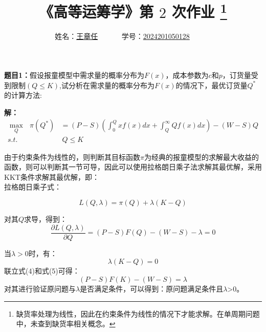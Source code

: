 \documentclass[12pt,a4paper]{article}
\begin{document}
\title{
{\heiti《高等运筹学》第 {$2$} 次作业
\footnote{
 缺货率处理为线性，因此在约束条件为线性的情况下才能求解。在单周期问题中，未查到缺货率相关概念。
}
}
}
\date{}

\author{
姓名：\underline{王章任}~~~~~~
学号：\underline{2024201050128}~~~~~~}

\maketitle

\noindent
\section*{\heiti \color{red}{报童模型拓展}}
\noindent
{\bf 题目1：}假设报童模型中需求量的概率分布为$F(x)$，成本参数为$c$和$p$，订货量受到限制$(Q\leq K)$,试分析在需求量的概率分布为$F(x)$的情况下，最优订货量$Q^*$的计算方法:



\vspace{5pt}
\noindent
{\bf 解：}
\begin{align}
    \max_Q\text{\ }\pi \left( Q^{*} \right) &=\left( P-S \right) \left( \int_0^Q{xf\left( x \right) dx+\int_Q^{\infty}{Qf\left( x \right) dx}} \right) -\left( W-S \right) Q \\
    s.t.&\ Q\le K
\end{align}


由于约束条件为线性的，则判断其目标函数$\pi $为经典的报童模型的求解最大收益的函数，则可以判断其一节可导，因此可以使用拉格朗日乘子法求解其最优解，采用KKT条件求解其最优解，即：\\
拉格朗日乘子式：

\begin{equation}
    L\left( Q,\lambda  \right) =\pi \left( Q \right) +\lambda \left( K-Q \right)
\end{equation}

对其$Q$求导，得到：
\begin{equation}
    \frac{\partial L\left( Q,\lambda  \right)}{\partial Q} =\left( P-S \right) F\left( Q\right) -\left( W-S \right) -\lambda =0
\end{equation}

当$\lambda >0$时，有：
\begin{equation}
    \lambda \left( K-Q \right) =0   
\end{equation}
联立式(4)和式(5)可得：
\begin{equation}
    \left( P-S \right) F\left( K\right) -\left( W-S \right) =\lambda              
\end{equation}
对其进行验证原问题与$\lambda$是否满足条件，可以得到：原问题满足条件且$\lambda$>0。
\end{document}
